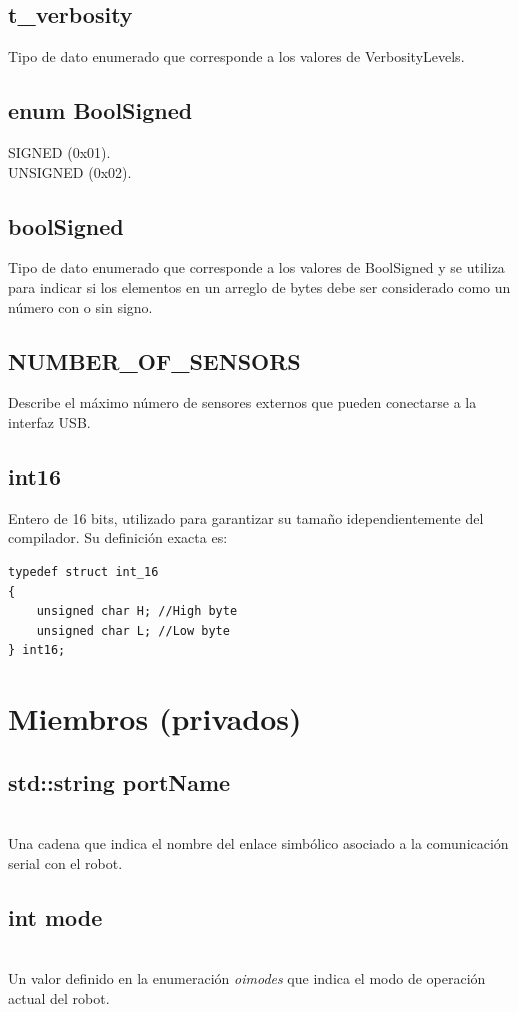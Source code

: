 \documentclass[letterpaper]{book}
\begin{document}
\subsection{t\_verbosity}
Tipo de dato enumerado que corresponde a los valores de VerbosityLevels.\\

\subsection { enum BoolSigned}
SIGNED (0x01).\\
UNSIGNED (0x02).\\
\subsection{ boolSigned}
Tipo de dato enumerado que corresponde a los valores de BoolSigned y se utiliza para indicar si los elementos en un arreglo de bytes debe ser considerado como un número con o sin signo.\\

\subsection{ NUMBER\_OF\_SENSORS }
Describe el máximo número de sensores externos que pueden conectarse a la interfaz USB.\\

\subsection{int16}
Entero de 16 bits, utilizado para garantizar su tamaño idependientemente del compilador. Su definición exacta es:\\
\begin{lstlisting}
typedef struct int_16
{
	unsigned char H; //High byte
	unsigned char L; //Low byte
} int16;
\end{lstlisting}

\section{Miembros (privados)}
\subsection{std::string portName}\mbox{}\\
Una cadena que indica el nombre del enlace simbólico asociado a la comunicación serial con el robot.
\subsection{int mode}\mbox{}\\
Un valor definido en la enumeración \emph{oimodes} que indica el modo de operación actual del robot.
\end{document}
